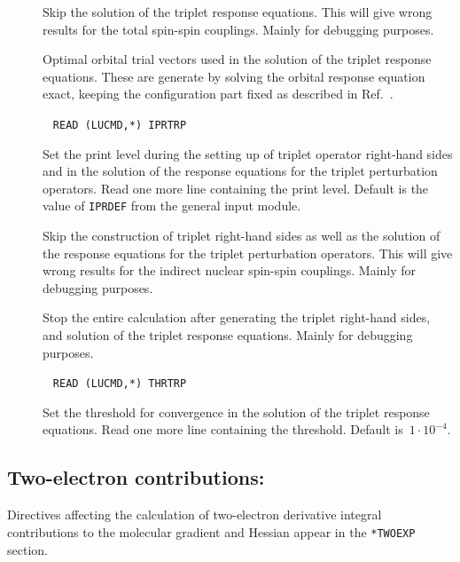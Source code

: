 \begin{description}
\item[] Skip the solution of the triplet response
equations. This will give wrong results for the total spin-spin
couplings. Mainly for debugging purposes.

\item[] Optimal orbital
trial vectors used in the
solution of the triplet response equations. These are generate by
solving the orbital response equation
exact, keeping the configuration part fixed as described in
Ref.~\cite{tuhjahjajpjjcp84}.

\item[]\verb| |\newline
\verb|READ (LUCMD,*) IPRTRP|

Set the print level during the setting up of triplet operator
right-hand sides and in the solution of the response equations for
the triplet perturbation operators. Read one more line containing the
print level. Default is the value of \verb|IPRDEF| from the
general input module.

\item[] Skip the construction of triplet right-hand
sides as well as the solution of the response equations for
the triplet perturbation operators. This will give wrong results for
the indirect nuclear spin-spin
couplings. Mainly for debugging
purposes.

\item[] Stop the entire calculation after generating the
triplet right-hand sides, and solution of the triplet response
equations. Mainly for debugging purposes.

\item[]\verb| |\newline
\verb|READ (LUCMD,*) THRTRP|

Set the threshold for convergence in the solution of the triplet
response equations. Read one more line containing the
threshold. Default is~$1\cdot10^{-4}$.
\end{description}

\subsection{Two-electron contributions: }

Directives affecting the calculation of two-electron derivative
integral contributions to the molecular gradient and
Hessian appear in
the \verb|*TWOEXP| section.

